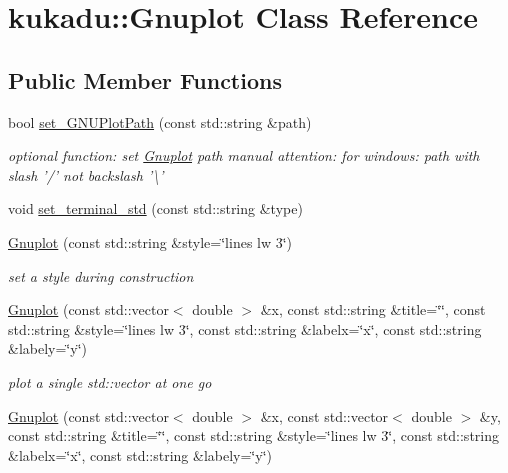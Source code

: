 \hypertarget{classkukadu_1_1Gnuplot}{\section{kukadu\-:\-:Gnuplot Class Reference}
\label{classkukadu_1_1Gnuplot}
}
\subsection*{Public Member Functions}
\begin{DoxyCompactItemize}
\item 
bool \hyperlink{classkukadu_1_1Gnuplot_a04d7a36bbe70dcb878a1ae5d8299d012}{set\-\_\-\-G\-N\-U\-Plot\-Path} (const std\-::string \&path)
\begin{DoxyCompactList}\small\item\em optional function\-: set \hyperlink{classkukadu_1_1Gnuplot}{Gnuplot} path manual attention\-: for windows\-: path with slash '/' not backslash '\textbackslash{}' \end{DoxyCompactList}\item 
void \hyperlink{classkukadu_1_1Gnuplot_aecc02fa13c09680a010e50331d50804c}{set\-\_\-terminal\-\_\-std} (const std\-::string \&type)
\item 
\hypertarget{classkukadu_1_1Gnuplot_afb20839c235bdf281f61a7c8e1ea8de9}{\hyperlink{classkukadu_1_1Gnuplot_afb20839c235bdf281f61a7c8e1ea8de9}{Gnuplot} (const std\-::string \&style=\char`\"{}lines lw 3\char`\"{})}\label{classkukadu_1_1Gnuplot_afb20839c235bdf281f61a7c8e1ea8de9}

\begin{DoxyCompactList}\small\item\em set a style during construction \end{DoxyCompactList}\item 
\hypertarget{classkukadu_1_1Gnuplot_a116918cb455b18e367cfcd34dfe2ecab}{\hyperlink{classkukadu_1_1Gnuplot_a116918cb455b18e367cfcd34dfe2ecab}{Gnuplot} (const std\-::vector$<$ double $>$ \&x, const std\-::string \&title=\char`\"{}\char`\"{}, const std\-::string \&style=\char`\"{}lines lw 3\char`\"{}, const std\-::string \&labelx=\char`\"{}x\char`\"{}, const std\-::string \&labely=\char`\"{}y\char`\"{})}\label{classkukadu_1_1Gnuplot_a116918cb455b18e367cfcd34dfe2ecab}

\begin{DoxyCompactList}\small\item\em plot a single std\-::vector at one go \end{DoxyCompactList}\item 
\hypertarget{classkukadu_1_1Gnuplot_a78963c977dfcc32904344da61d35e57a}{\hyperlink{classkukadu_1_1Gnuplot_a78963c977dfcc32904344da61d35e57a}{Gnuplot} (const std\-::vector$<$ double $>$ \&x, const std\-::vector$<$ double $>$ \&y, const std\-::string \&title=\char`\"{}\char`\"{}, const std\-::string \&style=\char`\"{}lines lw 3\char`\"{}, const std\-::string \&labelx=\char`\"{}x\char`\"{}, const std\-::string \&labely=\char`\"{}y\char`\"{})}\label{classkukadu_1_1Gnuplot_a78963c977dfcc32904344da61d35e57a}


\end{DoxyCompactItemize}
